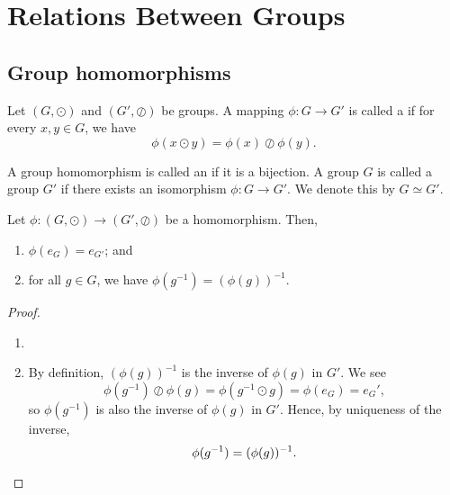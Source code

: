 \chapter{Relations Between Groups}

\section{Group homomorphisms}

\begin{defn}
Let $ (G,\odot) $ and $ (G',\oslash) $ be groups. A mapping $ \phi:G\to G' $ is called a  if for every $ x,y\in G $, we have
\begin{equation*}
    \phi(x\odot y)=\phi(x)\oslash\phi(y).
\end{equation*}
\end{defn}

\begin{defn}
A group homomorphism is called an  if it is a bijection. A group $ G $ is called  a group $ G' $ if there exists an isomorphism $ \phi:G\to G' $. We denote this by $ G\simeq G' $.
\end{defn}

\begin{prop}
Let $ \phi:(G,\odot)\to(G',\oslash) $ be a homomorphism. Then,
\begin{enumerate}
    \item $ \phi(e_G)=e_{G'} $; and
    \item for all $ g\in G $, we have $ \phi(g^{-1})=(\phi(g))^{-1} $.
\end{enumerate}
\end{prop}
\begin{proof}~
\begin{enumerate}
    \item {}
    \item By definition, $ (\phi(g))^{-1} $ is the inverse of $ \phi(g) $ in $ G' $. We see
    \begin{equation*}
        \phi(g^{-1})\oslash\phi(g)=\phi(g^{-1}\odot g)=\phi(e_G)=e_G',
    \end{equation*}
    so $ \phi(g^{-1}) $ is also the inverse of $ \phi(g) $ in $ G' $. Hence, by uniqueness of the inverse,
    \begin{equation*}
        \phi(g^{-1})=(\phi(g))^{-1}. \qedhere
    \end{equation*}
\end{enumerate}
\end{proof}

